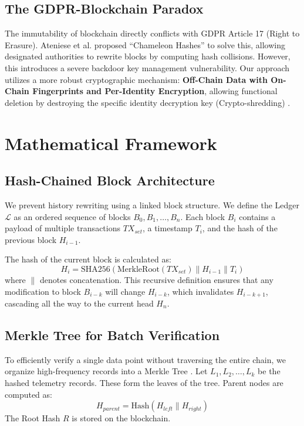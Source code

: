 \documentclass[conference]{IEEEtran}
\begin{document}
\subsection{The GDPR-Blockchain Paradox}
The immutability of blockchain directly conflicts with GDPR Article 17 (Right to Erasure). Ateniese et al. \cite{b10} proposed ``Chameleon Hashes'' to solve this, allowing designated authorities to rewrite blocks by computing hash collisions. However, this introduces a severe backdoor key management vulnerability. Our approach utilizes a more robust cryptographic mechanism: \textbf{Off-Chain Data with On-Chain Fingerprints and Per-Identity Encryption}, allowing functional deletion by destroying the specific identity decryption key (Crypto-shredding) \cite{b8}.

\section{Mathematical Framework}

\subsection{Hash-Chained Block Architecture}
We prevent history rewriting using a linked block structure. We define the Ledger $\mathcal{L}$ as an ordered sequence of blocks $B_0, B_1, \dots, B_n$.
Each block $B_i$ contains a payload of multiple transactions $TX_{set}$, a timestamp $T_i$, and the hash of the previous block $H_{i-1}$.

The hash of the current block is calculated as:
\begin{equation}
H_i = \text{SHA256}( \text{MerkleRoot}(TX_{set}) \parallel H_{i-1} \parallel T_i )
\end{equation}
where $\parallel$ denotes concatenation. This recursive definition ensures that any modification to block $B_{i-k}$ will change $H_{i-k}$, which invalidates $H_{i-k+1}$, cascading all the way to the current head $H_n$.

\subsection{Merkle Tree for Batch Verification}



To efficiently verify a single data point without traversing the entire chain, we organize high-frequency records into a Merkle Tree \cite{b6}.
Let $L_1, L_2, \dots, L_k$ be the hashed telemetry records. These form the leaves of the tree.
Parent nodes are computed as:
\begin{equation}
H_{parent} = \text{Hash}(H_{left} \parallel H_{right})
\end{equation}
The Root Hash $R$ is stored on the blockchain. 
\end{document}
